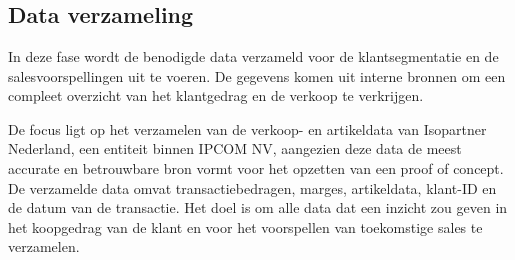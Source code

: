 
\chapter{}%
\label{ch:methodologie}




\section{Data verzameling}


In deze fase wordt de benodigde data verzameld voor de klantsegmentatie en de salesvoorspellingen uit te voeren. De gegevens komen uit interne bronnen om een compleet overzicht van het klantgedrag en de verkoop te verkrijgen.

\vspace{1 em}

De focus ligt op het verzamelen van de verkoop- en artikeldata van Isopartner Nederland, een entiteit binnen IPCOM NV, aangezien deze data de meest accurate en betrouwbare bron vormt voor het opzetten van een proof of concept. De verzamelde data omvat transactiebedragen, marges, artikeldata, klant-ID en de datum van de  transactie. Het doel is om alle data dat een inzicht zou geven in het koopgedrag van de klant en voor het voorspellen van toekomstige sales te verzamelen. 


